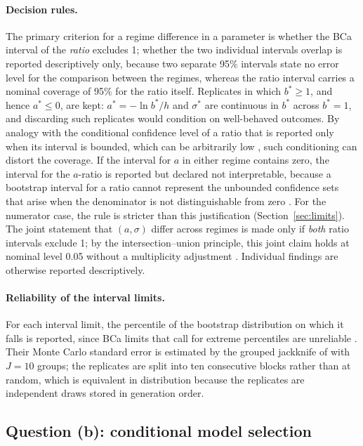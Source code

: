 \documentclass[11pt,a4paper]{article}
\begin{document}
\paragraph{Decision rules.} The primary criterion for a regime difference in a parameter is whether the BCa interval of the \emph{ratio} excludes 1; whether the two individual intervals overlap is reported descriptively only, because two separate 95\% intervals state no error level for the comparison between the regimes, whereas the ratio interval carries a nominal coverage of 95\% for the ratio itself. Replicates in which $b^*\ge 1$, and hence $a^*\le 0$, are kept: $a^*=-\ln b^*/h$ and $\sigma^*$ are continuous in $b^*$ across $b^*=1$, and discarding such replicates would condition on well-behaved outcomes. By analogy with the conditional confidence level of a ratio that is reported only when its interval is bounded, which can be arbitrarily low \citep[pp.~9--10]{franz2007}, such conditioning can distort the coverage. If the interval for $a$ in either regime contains zero, the interval for the $a$-ratio is reported but declared not interpretable, because a bootstrap interval for a ratio cannot represent the unbounded confidence sets that arise when the denominator is not distinguishable from zero \citetext{\citealp[pp.~9, 11]{franz2007}; \citealp[Sec.~5]{vonluxburg2009}}. For the numerator case, the rule is stricter than this justification (Section~\ref{sec:limits}). The joint statement that $(a,\sigma)$ differ across regimes is made only if \emph{both} ratio intervals exclude 1; by the intersection--union principle, this joint claim holds at nominal level 0.05 without a multiplicity adjustment \citep[Sec.~3, Thm.~1]{bergerhsu1996}. Individual findings are otherwise reported descriptively.

\paragraph{Reliability of the interval limits.} For each interval limit, the percentile of the bootstrap distribution on which it falls is reported, since BCa limits that call for extreme percentiles are unreliable \citep[pp.~8, 15]{efron2020}. Their Monte Carlo standard error is estimated by the grouped jackknife of \citet[Sec.~3]{efron2020} with $J=10$ groups; the replicates are split into ten consecutive blocks rather than at random, which is equivalent in distribution because the replicates are independent draws stored in generation order.

\subsection{Question (b): conditional model selection}\label{sec:bic2}
\end{document}
